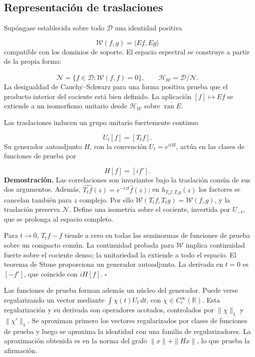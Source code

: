 \subsection{Representación de traslaciones}
\label{viii:rz:traslaciones}
Supóngase establecida sobre todo \(\mathcal D\) una identidad positiva

\[
\mathscr W(f,g)=\langle Ef,Eg\rangle
\]
compatible con los dominios de soporte. El espacio espectral se construye a partir de la propia forma:

\[
\mathcal N=\{f\in\mathcal D:\mathscr W(f,f)=0\},\qquad
\mathcal H_{\mathscr W}
=\overline{\mathcal D/\mathcal N}.
\]
La desigualdad de Cauchy–Schwarz para una forma positiva prueba que el producto interior del cociente está bien definido. La aplicación \([f]\mapsto Ef\) se extiende a un isomorfismo unitario desde \(\mathcal H_{\mathscr W}\) sobre \(\overline{\operatorname{ran}E}\).

Las traslaciones inducen un grupo unitario fuertemente continuo

\[
U_t[f]=[T_tf].
\]
Su generador autoadjunto \(H\), con la convención \(U_t=e^{itH}\), actúa en las clases de funciones de prueba por

\[
H[f]=[i f'].
\]
\textbf{Demostración.} Las correlaciones son invariantes bajo la traslación común de sus dos argumentos. Además, \(\widehat{T_tf}(z)=e^{-izt}\widehat f(z)\); en \(h_{T_tf,T_tg}(z)\) los factores se cancelan también para \(z\) complejo. Por ello \(\mathscr W(T_tf,T_tg)=\mathscr W(f,g)\), y la traslación preserva \(\mathcal N\). Define una isometría sobre el cociente, invertida por \(U_{-t}\), que se prolonga al espacio completo.

Para \(t\to0\), \(T_tf-f\) tiende a cero en todas las seminormas de funciones de prueba sobre un compacto común. La continuidad probada para \(\mathscr W\) implica continuidad fuerte sobre el cociente denso; la unitariedad la extiende a todo el espacio. El teorema de Stone proporciona un generador autoadjunto. La derivada en \(t=0\) es \([-f']\), que coincide con \(iH[f]\). \hfill\(\square\)

Las funciones de prueba forman además un núcleo del generador. Puede verse regularizando un vector mediante \(\int\chi(t)U_t\,dt\), con \(\chi\in C_c^\infty(\mathbb R)\). Esta regularización y su derivada son operadores acotados, controlados por \(\|\chi\|_1\) y \(\|\chi'\|_1\). Se aproximan primero los vectores regularizados por clases de funciones de prueba y luego se aproxima la identidad con una familia de regularizadores. La aproximación obtenida es en la norma del grafo \(\|x\|+\|Hx\|\), lo que prueba la afirmación.

